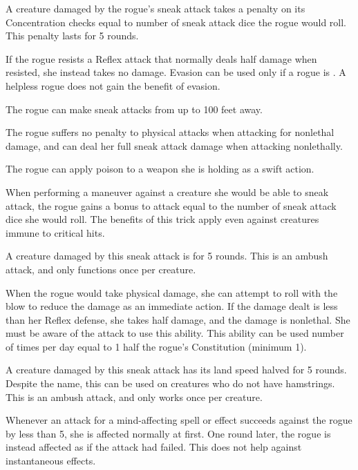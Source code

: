 A creature damaged by the rogue's sneak attack takes a penalty on its Concentration checks equal to number of sneak attack dice the rogue would roll.
This penalty lasts for 5 rounds.

If the rogue resists a Reflex attack that normally deals half damage when resisted, she instead takes no damage.
Evasion can be used only if a rogue is \unencumbered.
A helpless rogue does not gain the benefit of evasion.

The rogue can make sneak attacks from up to 100 feet away.

The rogue suffers no penalty to physical attacks when attacking for nonlethal damage, and can deal her full sneak attack damage when attacking nonlethally.

The rogue can apply poison to a weapon she is holding as a swift action.

When performing a maneuver against a creature she would be able to sneak attack, the rogue gains a bonus to attack equal to the number of sneak attack dice she would roll.
The benefits of this trick apply even against creatures immune to critical hits.

A creature damaged by this sneak attack is \bewildered for 5 rounds.
This is an ambush attack, and only functions once per creature.

When the rogue would take physical damage, she can attempt to roll with the blow to reduce the damage as an immediate action.
If the damage dealt is less than her Reflex defense, she takes half damage, and the damage is nonlethal.
She must be aware of the attack to use this ability.
This ability can be used number of times per day equal to 1 \add half the rogue's Constitution (minimum 1).

A creature damaged by this sneak attack has its land speed halved for 5 rounds.
Despite the name, this can be used on creatures who do not have hamstrings.
This is an ambush attack, and only works once per creature.

Whenever an attack for a mind-affecting spell or effect succeeds against the rogue by less than 5, she is affected normally at first.
One round later, the rogue is instead affected as if the attack had failed.
This does not help against instantaneous effects.

